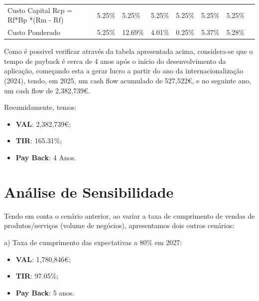 \documentclass[11pt]{article}
\begin{document}
\begin{adjustbox}{center}
\begin{tabular}{lrrrrrrr}
			\multicolumn{1}{|l|}{Custo Capital Rcp = Rf*Bp *(Rm - Rf)}    & \multicolumn{1}{l|}{5.25\%}    & \multicolumn{1}{l|}{5.25\%}    & \multicolumn{1}{l|}{5.25\%}   & \multicolumn{1}{l|}{5.25\%}    & \multicolumn{1}{l|}{5.25\%}  & \multicolumn{1}{l|}{5.25\%}    & \multicolumn{1}{l}{}           \\ \cline{1-7}
			\multicolumn{1}{|l|}{Custo Ponderado}                         & \multicolumn{1}{l|}{5.25\%}    & \multicolumn{1}{l|}{12.69\%}   & \multicolumn{1}{l|}{4.01\%}   & \multicolumn{1}{l|}{0.25\%}    & \multicolumn{1}{l|}{5.37\%}  & \multicolumn{1}{l|}{5.28\%}    & \multicolumn{1}{l}{}           \\ \cline{1-7}
		\end{tabular}
	\end{adjustbox}
	\normalsize
	
	\vspace{1cm}
	
	Como é possivel verificar através da tabela apresentada acima, considera-se que o tempo de payback é cerca de 4 anos após o início do desenvolvimento da aplicação, começando esta a gerar lucro a partir do ano da internacionalização (2024), tendo, em 2025, um cash flow acumulado de 527,522€, e no seguinte ano, um cash flow de 2,382,739€.
	
	Resumidamente, temos:
	
	\begin{itemize}
		\item \textbf{VAL}: 2,382,739€;
		\item \textbf{TIR}: 165.31\%;
		\item \textbf{Pay Back}: 4 Anos.
	\end{itemize}
	
	\pagebreak
	
	\large
	\section{Análise de Sensibilidade}
	
	\normalsize
	
	Tendo em conta o cenário anterior, ao variar a taxa de cumprimento de vendas de produtos/serviços (volume de negócios), apresentamos dois outros cenários:
	
	a)
	Taxa de cumprimento das expectativas a 80\% em 2027:
	\begin{itemize}
		\item \textbf{VAL}: 1,780,846€;
		\item \textbf{TIR}: 97.05\%;
		\item \textbf{Pay Back}: 5 anos.
	\end{itemize}
	
\end{document}
